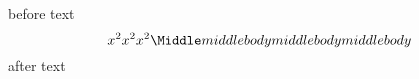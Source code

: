 before text 
\[ 
      x^2 
      x^2 
      x^2 
\Middle
      middle body
      middle body
      middle body
\]
after text
